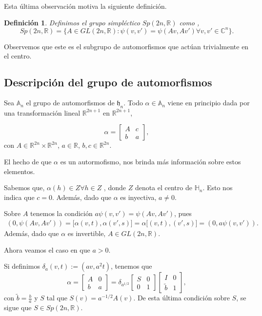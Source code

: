 \documentclass[12pt]{article}
\newtheorem{definition}{Definición}
\begin{document}
Esta última observación motiva la siguiente definición. 
\begin{definition}
 Definimos el grupo simpléctico $Sp(2n,\mathbb{R})$ como ,
 $$
 Sp(2n,\mathbb{R})=\{ A \in GL(2n,\mathbb{R}): \psi(v,v')=\psi(Av,Av') \forall v,v' \in \mathbb{C}^n\}.
 $$
\end{definition}
Observemos que este es el subgrupo de automorfismos que actúan trivialmente en el centro.

\subsection{Descripción del grupo de automorfismos}
Sea $\mathbb{A}_n$ el grupo de automorfismos  de $\mathfrak{h}_n$.
Todo $\alpha \in \mathbb{A}_n$ viene en principio dada por una transformación lineal  $\mathbb{R}^{2n+1}$ en $\mathbb{R}^{2n+1}$,

$$\alpha=
\begin{bmatrix}
A & c\\
b & a
\end{bmatrix},$$
con $A \in  \mathbb{R}^{2n} \times \mathbb{R}^{2n}$, $a \in \mathbb{R}$, $b,c \in \mathbb{R}^{2n}$.

El hecho de que $\alpha$ es un autormofismo, nos brinda más información sobre estos elementos.

Sabemos que, $\alpha(h) \in Z \forall h \in Z$ , donde $Z$ denota el centro de $\mathbb{H}_n$.
Esto nos indica que $c=0$.
Además, dado que $\alpha$ es inyectiva, $a\neq0$.

Sobre $A$ tenemos la condición $a \psi(v,v')=\psi(A v,A v')$, pues
$$\begin{aligned}
(0,\psi(A v,A v'))={[}\alpha(v,t),\alpha(v',s){]}=\alpha{[}(v,t),(v',s){]}=(0,a \psi(v,v')).
\end{aligned}$$
Además, dado que $\alpha$ es invertible, $A \in GL(2n,\mathbb{R})$.

Ahora veamos el caso en que $a >0$.

Si definimos $\delta_a (v,t) :=(a v,a^2 t)$, tenemos que 
$$\alpha=
\begin{bmatrix}
A & 0\\
b & a
\end{bmatrix}=
\delta_{a^{1/2}}
\begin{bmatrix}
S & 0\\
0 & 1
\end{bmatrix}
\begin{bmatrix}
I & 0\\
\tilde{b} & 1
\end{bmatrix},
$$
con $\tilde{b}=\frac{b}{a}$ y  $S$ tal que $S(v)=a^{-1/2} A(v)$.
De esta última condición sobre $S$, se sigue que $S \in Sp(2n,\mathbb{R}).$
\end{document}
